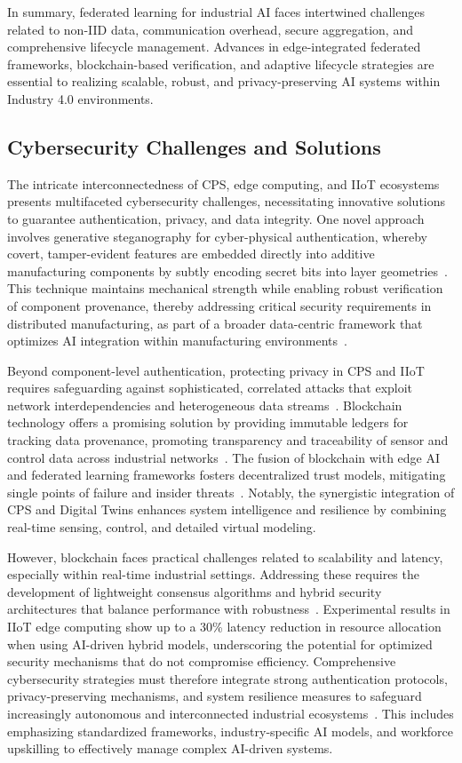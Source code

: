 \documentclass[sigconf]{acmart}
\begin{document}
In summary, federated learning for industrial AI faces intertwined challenges related to non-IID data, communication overhead, secure aggregation, and comprehensive lifecycle management. Advances in edge-integrated federated frameworks, blockchain-based verification, and adaptive lifecycle strategies are essential to realizing scalable, robust, and privacy-preserving AI systems within Industry 4.0 environments.

\subsection{Cybersecurity Challenges and Solutions}

The intricate interconnectedness of CPS, edge computing, and IIoT ecosystems presents multifaceted cybersecurity challenges, necessitating innovative solutions to guarantee authentication, privacy, and data integrity. One novel approach involves generative steganography for cyber-physical authentication, whereby covert, tamper-evident features are embedded directly into additive manufacturing components by subtly encoding secret bits into layer geometries~\cite{ref9}. This technique maintains mechanical strength while enabling robust verification of component provenance, thereby addressing critical security requirements in distributed manufacturing, as part of a broader data-centric framework that optimizes AI integration within manufacturing environments~\cite{ref13}.

Beyond component-level authentication, protecting privacy in CPS and IIoT requires safeguarding against sophisticated, correlated attacks that exploit network interdependencies and heterogeneous data streams~\cite{ref15}. Blockchain technology offers a promising solution by providing immutable ledgers for tracking data provenance, promoting transparency and traceability of sensor and control data across industrial networks~\cite{ref20}. The fusion of blockchain with edge AI and federated learning frameworks fosters decentralized trust models, mitigating single points of failure and insider threats~\cite{ref22}. Notably, the synergistic integration of CPS and Digital Twins enhances system intelligence and resilience by combining real-time sensing, control, and detailed virtual modeling.

However, blockchain faces practical challenges related to scalability and latency, especially within real-time industrial settings. Addressing these requires the development of lightweight consensus algorithms and hybrid security architectures that balance performance with robustness~\cite{ref31}. Experimental results in IIoT edge computing show up to a 30\% latency reduction in resource allocation when using AI-driven hybrid models, underscoring the potential for optimized security mechanisms that do not compromise efficiency. Comprehensive cybersecurity strategies must therefore integrate strong authentication protocols, privacy-preserving mechanisms, and system resilience measures to safeguard increasingly autonomous and interconnected industrial ecosystems~\cite{ref32}. This includes emphasizing standardized frameworks, industry-specific AI models, and workforce upskilling to effectively manage complex AI-driven systems.
\end{document}

